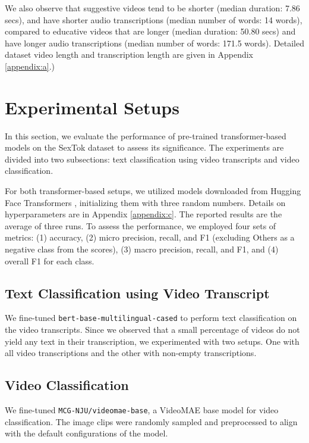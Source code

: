 \documentclass[11pt]{article}
\begin{document}
We also observe that suggestive videos tend to be shorter (median duration: 7.86 secs), and have shorter audio transcriptions (median number of words: 14 words), compared to educative videos that are longer (median duration: 50.80 secs) and have longer audio transcriptions (median number of words: 171.5 words). Detailed dataset video length and transcription length are given in Appendix \ref{appendix:a}.)

\section{Experimental Setups}

In this section, we evaluate the performance of pre-trained transformer-based models on the SexTok dataset to assess its significance. The experiments are divided into two subsections: text classification using video transcripts and video classification. 

For both transformer-based setups, we utilized models downloaded from Hugging Face Transformers \citep{wolf-etal-2020-transformers}, initializing them with three random numbers. Details on hyperparameters are in Appendix \ref{appendix:c}. The reported results are the average of three runs. To assess the performance, we employed four sets of metrics: (1) accuracy, (2) micro precision, recall, and F1 (excluding Others as a negative class from the scores), (3) macro precision, recall, and F1, and (4) overall F1 for each class.

\subsection*{Text Classification using Video Transcript}

We fine-tuned {\tt bert-base-multilingual-cased} \citep{DBLP:journals/corr/abs-1810-04805} to perform text classification on the video transcripts. Since we observed that a small percentage of videos do not yield any text in their transcription, we experimented with two setups. One with all video transcriptions and the other with non-empty transcriptions. 

\subsection*{Video Classification}

We fine-tuned {\tt MCG-NJU/videomae-base}, a VideoMAE base model \cite{videomae} for video classification. The image clips were randomly sampled and preprocessed to align with the default configurations of the model.
\end{document}

